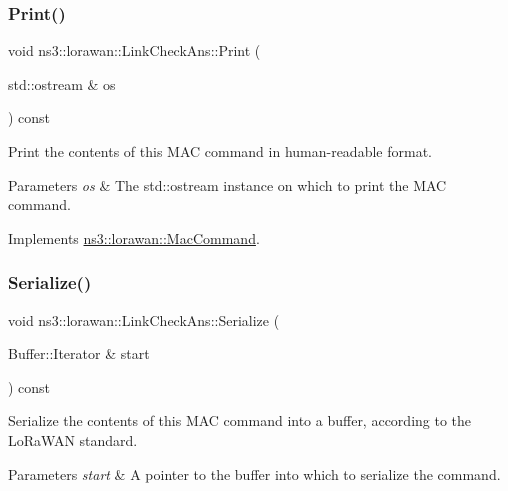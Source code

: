 \subsubsection{\texorpdfstring{Print()}{Print()}}
{\footnotesize\ttfamily void ns3\+::lorawan\+::\+Link\+Check\+Ans\+::\+Print (\begin{DoxyParamCaption}\item[{std\+::ostream \&}]{os }\end{DoxyParamCaption}) const\hspace{0.3cm}{\ttfamily [virtual]}}

Print the contents of this M\+AC command in human-\/readable format.


\begin{DoxyParams}{Parameters}
{\em os} & The std\+::ostream instance on which to print the M\+AC command. \\
\hline
\end{DoxyParams}


Implements \hyperlink{classns3_1_1lorawan_1_1MacCommand_a6bf88db38dab7dcd817811a9fb59f920}{ns3\+::lorawan\+::\+Mac\+Command}.

\mbox{\label{classns3_1_1lorawan_1_1LinkCheckAns_a54d7dcbbf322ece82652a5ac3603f83c}} 
\subsubsection{\texorpdfstring{Serialize()}{Serialize()}}
{\footnotesize\ttfamily void ns3\+::lorawan\+::\+Link\+Check\+Ans\+::\+Serialize (\begin{DoxyParamCaption}\item[{Buffer\+::\+Iterator \&}]{start }\end{DoxyParamCaption}) const\hspace{0.3cm}{\ttfamily [virtual]}}

Serialize the contents of this M\+AC command into a buffer, according to the Lo\+Ra\+W\+AN standard.


\begin{DoxyParams}{Parameters}
{\em start} & A pointer to the buffer into which to serialize the command. \\
\hline
\end{DoxyParams}


